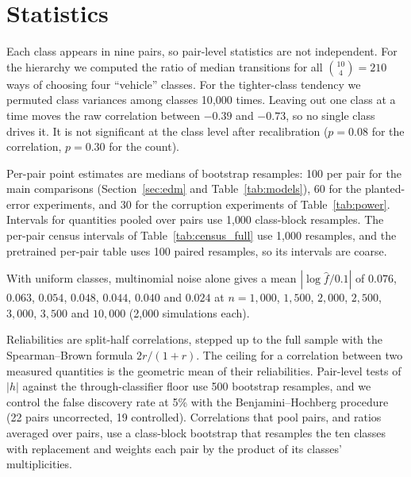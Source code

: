 \section{Statistics}
\label{app:stats}

Each class appears in nine pairs, so pair-level statistics are not independent. For the hierarchy we computed the ratio of median transitions for all $\binom{10}{4}=210$ ways of choosing four ``vehicle'' classes. For the tighter-class tendency we permuted class variances among classes 10{,}000 times. Leaving out one class at a time moves the raw correlation between $-0.39$ and $-0.73$, so no single class drives it. It is not significant at the class level after recalibration ($p=0.08$ for the correlation, $p=0.30$ for the count).

Per-pair point estimates are medians of bootstrap resamples: 100 per pair for the main comparisons (Section~\ref{sec:edm} and Table~\ref{tab:models}), 60 for the planted-error experiments, and 30 for the corruption experiments of Table~\ref{tab:power}. Intervals for quantities pooled over pairs use 1{,}000 class-block resamples. The per-pair census intervals of Table~\ref{tab:census_full} use 1{,}000 resamples, and the pretrained per-pair table uses 100 paired resamples, so its intervals are coarse.

With uniform classes, multinomial noise alone gives a mean $|\log\hat f/0.1|$ of $0.076$, $0.063$, $0.054$, $0.048$, $0.044$, $0.040$ and $0.024$ at $n=1{,}000$, $1{,}500$, $2{,}000$, $2{,}500$, $3{,}000$, $3{,}500$ and $10{,}000$ (2{,}000 simulations each).

Reliabilities are split-half correlations, stepped up to the full sample with the Spearman--Brown formula $2r/(1+r)$. The ceiling for a correlation between two measured quantities is the geometric mean of their reliabilities. Pair-level tests of $|h|$ against the through-classifier floor use 500 bootstrap resamples, and we control the false discovery rate at 5\% with the Benjamini--Hochberg procedure (22 pairs uncorrected, 19 controlled). Correlations that pool pairs, and ratios averaged over pairs, use a class-block bootstrap that resamples the ten classes with replacement and weights each pair by the product of its classes' multiplicities.

